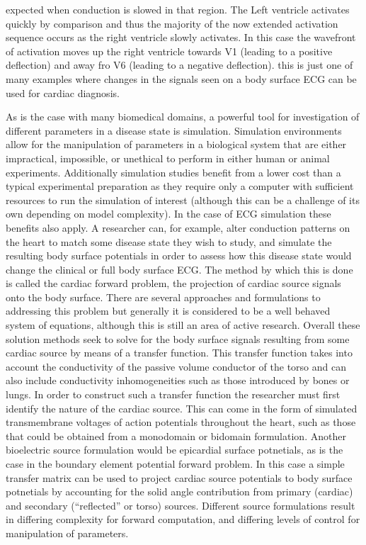 \documentclass[12pt]{article}
\begin{document}
expected when conduction is slowed in that region. The Left ventricle activates quickly by comparison and thus the majority of the now extended activation sequence occurs as the right ventricle slowly activates. In this case the wavefront of activation moves up the right ventricle towards V1 (leading to a positive deflection) and away fro V6 (leading to a negative deflection). this is just one of many examples where changes in the signals seen on a body surface ECG can be used for cardiac diagnosis. 

As is the case with many biomedical domains, a powerful tool for investigation of different parameters in a disease state is simulation. Simulation environments allow for the manipulation of parameters in a biological system that are either impractical, impossible, or unethical to perform in either human or animal experiments. Additionally simulation studies benefit from a lower cost than a typical experimental preparation as they require only a computer with sufficient resources to run the simulation of interest (although this can be a challenge of its own depending on model complexity). In the case of ECG simulation these benefits also apply. A researcher can, for example, alter conduction patterns on the heart to match some disease state they wish to study, and simulate the resulting body surface potentials in order to assess how this disease state would change the clinical or full body surface ECG. The method by which this is done is called the cardiac forward problem, the projection of cardiac source signals onto the body surface.\cite{RSM:Bar77} There are several approaches and formulations to addressing this problem but generally it is considered to be a well behaved system of equations, although this is still an area of active research.\cite{RSM:Bar77,Bear2015,Burton2018a} Overall these solution methods seek to solve for the body surface signals resulting from some cardiac source by means of a transfer function. This transfer function takes into account the conductivity of the passive volume conductor of the torso and can also include conductivity inhomogeneities such as those introduced by bones or lungs. In order to construct such a transfer function the researcher must first identify the nature of the cardiac source. This can come in the form of simulated transmembrane voltages of action potentials throughout the heart, such as those that could be obtained from a monodomain or bidomain formulation. Another bioelectric source formulation would be epicardial surface potnetials, as is the case in the boundary element potential forward problem. In this case a simple transfer matrix can be used to project cardiac source potentials to body surface potnetials by accounting for the solid angle contribution from primary (cardiac) and secondary (``reflected'' or torso) sources. Different source formulations result in differing complexity for forward computation, and differing levels of control for manipulation of parameters.
\end{document}
